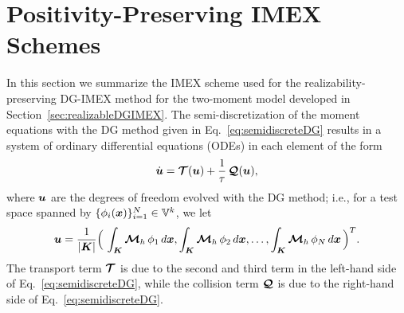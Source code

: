 \section{Positivity-Preserving IMEX Schemes}
\label{sec:imex}

In this section we summarize the IMEX scheme used for the realizability-preserving DG-IMEX method for the two-moment model developed in Section~\ref{sec:realizableDGIMEX}.  
The semi-discretization of the moment equations with the DG method given in Eq.~\eqref{eq:semidiscreteDG} results in a system of ordinary differential equations (ODEs) in each element of the form
\begin{equation}
  \dot{\boldsymbol{u}}
  =\boldsymbol{\mathcal{T}}(\boldsymbol{u})+\frac{1}{\tau}\,\boldsymbol{\mathcal{Q}}(\boldsymbol{u}),
  \label{eq:ode}
\end{equation}
where $\boldsymbol{u}$ are the degrees of freedom evolved with the DG method; i.e., for a test space spanned by $\{\phi_{i}(\boldsymbol{x})\}_{i=1}^{N}\in\mathbb{V}^{k}$, we let
\begin{equation}
  \boldsymbol{u}=\frac{1}{|\boldsymbol{K}|}\Big(\,\int_{\boldsymbol{K}}\boldsymbol{\mathcal{M}}_{h}\,\phi_{1}\,d\boldsymbol{x},\int_{\boldsymbol{K}}\boldsymbol{\mathcal{M}}_{h}\,\phi_{2}\,d\boldsymbol{x},\ldots,\int_{\boldsymbol{K}}\boldsymbol{\mathcal{M}}_{h}\,\phi_{N}\,d\boldsymbol{x}\,\Big)^{T}.
\end{equation}
The transport term $\boldsymbol{\mathcal{T}}$ is due to the second and third term in the left-hand side of Eq.~\eqref{eq:semidiscreteDG}, while the collision term $\boldsymbol{\mathcal{Q}}$ is due to the right-hand side of Eq.~\eqref{eq:semidiscreteDG}.  

